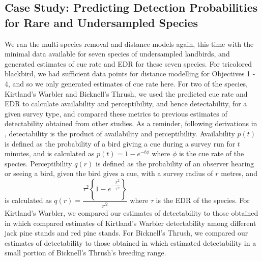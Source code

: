 \documentclass[12pt]{article}
\begin{document}
\subsection{Case Study: Predicting Detection Probabilities for Rare and Undersampled Species}
\par We ran the multi-species removal and distance models again, this time with the minimal data available for seven species of undersampled landbirds, and generated estimates of cue rate and EDR for these seven species.
For tricolored blackbird, we had sufficient data points for distance modelling for Objectives 1 - 4, and so we only generated estimates of cue rate here.
For two of the species, Kirtland's Warbler and Bicknell's Thrush, we used the predicted cue rate and EDR to calculate availability and perceptibility, and hence detectability, for a given survey type, and compared these metrics to previous estimates of detectability obtained from other studies.
As a reminder, following derivations in \citet{solymos_calibrating_2013}, detectability is the product of availability and perceptibility.
Availability $p(t)$ is defined as the probability of a bird giving a cue during a survey run for $t$ minutes, and is calculated as
$p(t) = 1 - e^{-t\phi}$
where $\phi$ is the cue rate of the species.
Perceptibility $q(r)$ is defined as the probability of an observer hearing or seeing a bird, given the bird gives a cue, with a survey radius of $r$ metres, and is calculated as
$q(r) = \dfrac{\tau^2 \left\{1 - e^{-\dfrac{r^2}{\tau^2}}\right\}}{r^2}$
where $\tau$ is the EDR of the species.
For Kirtland's Warbler, we compared our estimates of detectability to those obtained in \citet{van_dyke_comparative_2022} which compared estimates of Kirtland's Warbler detectability among different jack pine stands and red pine stands.
For Bicknell's Thrush, we compared our estimates of detectability to those obtained in \citet{aubry_bicknells_2018} which estimated detectability in a small portion of Bicknell's Thrush's breeding range.
\end{document}
